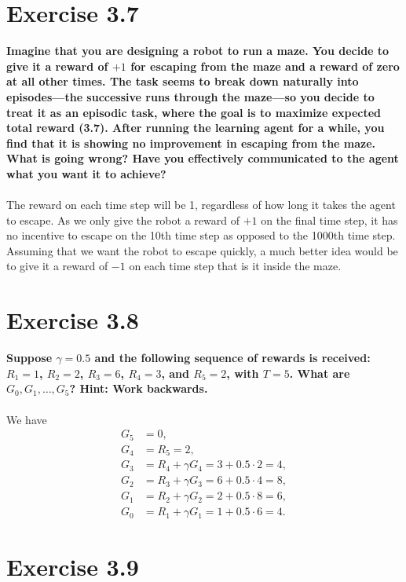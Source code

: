 \documentclass[a4paper,11pt]{article}
\numberwithin{equation}{section}
\theoremstyle{remark}
\begin{document}
\section{Exercise 3.7}

\textbf{Imagine that you are designing a robot to run a maze. You decide to give it a reward of $+1$ for escaping from the maze and a reward of zero at all other times. The task seems to break down naturally into episodes—the successive runs through the maze—so you decide to treat it as an episodic task, where the goal is to maximize expected total reward (3.7). After running the learning agent for a while, you find that it is showing no improvement in escaping from the maze. What is going wrong? Have you effectively communicated to the agent what you want it to achieve?}
\\ \\
The reward on each time step will be 1, regardless of how long it takes the agent to escape. As we only give the robot a reward of $+1$ on the final time step, it has no incentive to escape on the 10th time step as opposed to the 1000th time step. Assuming that we want the robot to escape quickly, a much better idea would be to give it a reward of $-1$ on each time step that is it inside the maze. 

\section{Exercise 3.8}

\textbf{Suppose $\gamma = 0.5$ and the following sequence of rewards is received: $R_1 = 1$, $R_2 = 2$, $R_3 = 6$, $R_4 = 3$, and $R_5 = 2$, with $T = 5$. What are $G_0, G_1, \dots, G_5$? Hint: Work backwards.}
\\ \\
We have
\begin{align*}
	G_5 & = 0, \\
	G_4 & = R_5 = 2, \\
	G_3 & = R_4 + \gamma G_4 = 3 + 0.5 \cdot 2 = 4, \\
	G_2 & = R_3 + \gamma G_3 = 6 + 0.5 \cdot 4 = 8, \\
	G_1 & = R_2 + \gamma G_2 = 2 + 0.5 \cdot 8 = 6, \\
	G_0 & = R_1 + \gamma G_1 = 1 + 0.5 \cdot 6 = 4. 
\end{align*}
	
\section{Exercise 3.9}
\end{document}
